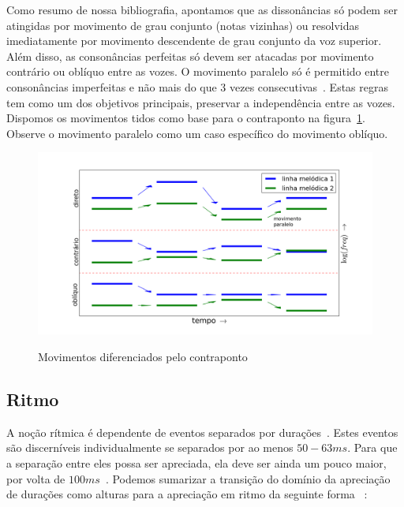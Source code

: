 Como
resumo de nossa bibliografia, apontamos que as dissonâncias só podem ser atingidas por movimento de
grau conjunto (notas vizinhas) ou resolvidas
imediatamente por movimento descendente de grau conjunto da voz superior. Além disso,
as consonâncias perfeitas só devem ser atacadas por movimento contrário ou oblíquo entre
as vozes. O movimento paralelo só é permitido entre consonâncias imperfeitas e não mais
do que 3 vezes consecutivas~\cite{Fux,Tragtenberg,SchoenbergContra}.
Estas regras tem como um dos objetivos principais, preservar a independência entre as vozes. Dispomos os movimentos tidos como base para o contraponto na figura~\ref{fig:movContraponto}. Observe o movimento paralelo como um caso específico do movimento oblíquo.


\begin{figure}[h!]
    \centering
    \caption{Movimentos diferenciados pelo contraponto}
        \includegraphics[width=\textwidth]{figuras/movContraponto}
        \label{fig:movContraponto}
\end{figure}




\subsection{Ritmo}
A noção rítmica é dependente de eventos separados por durações~\cite{rythm}. Estes eventos são discerníveis individualmente se separados
por ao menos $50-63ms$. Para que a separação entre eles possa ser apreciada, ela deve ser ainda um pouco maior,
por volta de $100ms$~\cite{microsound}. Podemos sumarizar 
a transição do domínio da apreciação
de durações como alturas para a apreciação em ritmo da seguinte forma ~\cite{Alfaix, microsound}:

